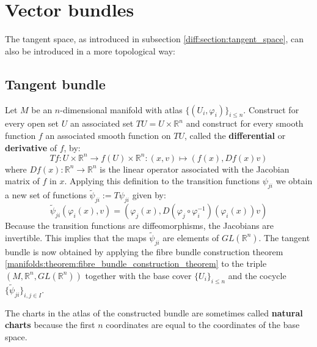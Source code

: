 \section{Vector bundles}
	The tangent space, as introduced in subsection \ref{diff:section:tangent_space}, can also be introduced in a more topological way:
	
\subsection{Tangent bundle}

	\begin{construct}
		Let $M$ be an $n$-dimensional manifold with atlas $\{(U_i, \varphi_i)\}_{i\leq n}$. Construct for every open set $U$ an associated set $TU = U\times\mathbb{R}^n$ and construct for every smooth function $f$ an associated smooth function on $TU$, called the \textbf{differential} or \textbf{derivative} of $f$, by:
		\begin{equation}
			\label{diff:manifolds:T_function}
			Tf:U\times\mathbb{R}^n\rightarrow f(U)\times\mathbb{R}^n:(x, v)\mapsto(f(x), Df(x)v)
		\end{equation}
		where $Df(x):\mathbb{R}^n\rightarrow\mathbb{R}^n$ is the linear operator associated with the Jacobian matrix of $f$ in $x$. Applying this definition to the transition functions $\psi_{ji}$ we obtain a new set of functions $\widetilde{\psi}_{ji} := T\psi_{ji}$ given by:
		\begin{equation}
			\widetilde{\psi}_{ji}(\varphi_i(x), v) = \left(\varphi_j(x), D(\varphi_j\circ\varphi_i^{-1})(\varphi_i(x))v\right)
		\end{equation}
		Because the transition functions are diffeomorphisms, the Jacobians are invertible. This implies that the maps $\widetilde\psi_{ji}$ are elements of $GL(\mathbb{R}^n)$. The tangent bundle is now obtained by applying the fibre bundle construction theorem \ref{manifolds:theorem:fibre_bundle_construction_theorem} to the triple $(M, \mathbb{R}^n, GL(\mathbb{R}^n))$ together with the base cover $\{U_i\}_{i\leq n}$ and the cocycle $\{\widetilde\psi_{ji}\}_{i,j\in I}$.
	\end{construct}
	\begin{remark*}
		The charts in the atlas of the constructed bundle are sometimes called \textbf{natural charts} because the first $n$ coordinates are equal to the coordinates of the base space.
	\end{remark*}

